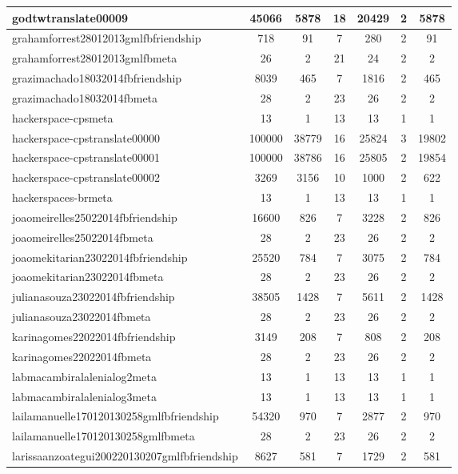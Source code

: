 \begin{table*}[h!]
\begin{center}
\begin{tabular}{| l | c | c | c | c | c | c |}
godtwtranslate00009 & 45066  & 5878  & 18  & 20429  & 2  & 5878 \\\hline
grahamforrest28012013gmlfbfriendship & 718  & 91  & 7  & 280  & 2  & 91 \\\hline
grahamforrest28012013gmlfbmeta & 26  & 2  & 21  & 24  & 2  & 2 \\\hline
grazimachado18032014fbfriendship & 8039  & 465  & 7  & 1816  & 2  & 465 \\\hline
grazimachado18032014fbmeta & 28  & 2  & 23  & 26  & 2  & 2 \\\hline
hackerspace-cpsmeta & 13  & 1  & 13  & 13  & 1  & 1 \\\hline
hackerspace-cpstranslate00000 & 100000  & 38779  & 16  & 25824  & 3  & 19802 \\\hline
hackerspace-cpstranslate00001 & 100000  & 38786  & 16  & 25805  & 2  & 19854 \\\hline
hackerspace-cpstranslate00002 & 3269  & 3156  & 10  & 1000  & 2  & 622 \\\hline
hackerspaces-brmeta & 13  & 1  & 13  & 13  & 1  & 1 \\\hline
joaomeirelles25022014fbfriendship & 16600  & 826  & 7  & 3228  & 2  & 826 \\\hline
joaomeirelles25022014fbmeta & 28  & 2  & 23  & 26  & 2  & 2 \\\hline
joaomekitarian23022014fbfriendship & 25520  & 784  & 7  & 3075  & 2  & 784 \\\hline
joaomekitarian23022014fbmeta & 28  & 2  & 23  & 26  & 2  & 2 \\\hline
julianasouza23022014fbfriendship & 38505  & 1428  & 7  & 5611  & 2  & 1428 \\\hline
julianasouza23022014fbmeta & 28  & 2  & 23  & 26  & 2  & 2 \\\hline
karinagomes22022014fbfriendship & 3149  & 208  & 7  & 808  & 2  & 208 \\\hline
karinagomes22022014fbmeta & 28  & 2  & 23  & 26  & 2  & 2 \\\hline
labmacambiralalenialog2meta & 13  & 1  & 13  & 13  & 1  & 1 \\\hline
labmacambiralalenialog3meta & 13  & 1  & 13  & 13  & 1  & 1 \\\hline
lailamanuelle170120130258gmlfbfriendship & 54320  & 970  & 7  & 2877  & 2  & 970 \\\hline
lailamanuelle170120130258gmlfbmeta & 28  & 2  & 23  & 26  & 2  & 2 \\\hline
larissaanzoategui200220130207gmlfbfriendship & 8627  & 581  & 7  & 1729  & 2  & 581 \\\hline

\end{tabular}
\end{center}
\end{table*}
